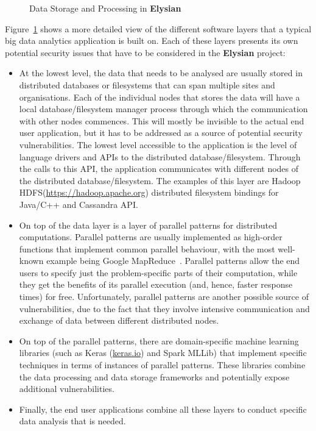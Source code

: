 \documentclass[a4paper,11pt]{article}
\newcommand{\project}[1]{\textbf{#1}\xspace}
\newcommand{\SECURITY}{\project{Elysian}}
\newcommand{\TheProject}{\SECURITY}
\begin{document}
\begin{figure}[tph!]
  \begin{center}
  \vspace{-19mm}
  \vspace{-2.3cm}
  \caption{Data Storage and Processing in \TheProject{}}
  \label{fig:storageprocessing}
  \end{center}
  \end{figure}

Figure~\ref{fig:storageprocessing} shows a more detailed view of the different software layers that a typical big data analytics application is built on. Each of these layers presents its own potential security issues that have to be considered in the \TheProject{} project: 
\begin{itemize}
\item At the lowest level, the data that needs to be analysed are usually stored in distributed databases or filesystems that can span multiple sites and organisations. Each of the individual nodes that stores the data will have a local database/filesystem manager process through which the communication with other nodes commences. This will mostly be invisible to the actual end user application, but it has to be addressed as a source of potential security vulnerabilities. The lowest level accessible to the application is the level of language drivers and APIs to the distributed database/filesystem. Through the calls to this API, the application communicates with different nodes of the distributed database/filesystem. The examples of this layer are Hadoop HDFS(\url{https://hadoop.apache.org}) distributed filesystem bindings for Java/C++ and Cassandra API. 
\item On top of the data layer is a layer of parallel patterns for distributed computations. Parallel patterns are usually implemented as high-order functions that implement common parallel behaviour, with the most well-known example being Google MapReduce~\cite{mapreduce}. Parallel patterns allow the end users to specify just the problem-specific parts of their computation, while they get the benefits of its parallel execution (and, hence, faster response times) for free. Unfortunately, parallel patterns are another possible source of vulnerabilities, due to the fact that they involve intensive communication and exchange of data between different distributed nodes. 
\item On top of the parallel patterns, there are domain-specific machine learning libraries (such as Keras (\url{keras.io}) and Spark MLLib) that implement specific %
techniques in terms of instances of parallel patterns. These libraries combine the data processing and data storage frameworks and potentially expose additional vulnerabilities. 
\item Finally, the end user applications combine all these layers to conduct specific data analysis that is needed. 
\end{itemize}
\end{document}
